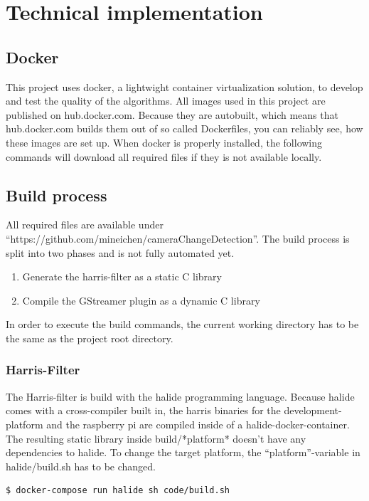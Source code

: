 \chapter {Technical implementation}

\section{ Docker }
This project uses docker, a lightwight container virtualization solution, to develop and test the quality of the algorithms. All images used in this project are published on hub.docker.com. Because they are autobuilt, which means that hub.docker.com builds them out of so called Dockerfiles, you can reliably see, how these images are set up. When docker is properly installed, the following commands will download all required files if they is not available locally.

\section{Build process}
All required files are available under \enquote{https://github.com/mineichen/cameraChangeDetection}. The build process is split into two phases and is not fully automated yet.
 
\begin{enumerate}
	\item{ Generate the harris-filter as a static C library}
	\item{ Compile the GStreamer plugin as a dynamic C library}
\end{enumerate}

In order to execute the build commands, the current working directory has to be the same as the project root directory.

\subsection{Harris-Filter}
The Harris-filter is build with the halide programming language. Because halide comes with a cross-compiler built in, the harris binaries for the development-platform and the raspberry pi are compiled inside of a halide-docker-container. The resulting static library inside build/*platform* doesn't have any dependencies to halide. To change the target platform, the \enquote{platform}-variable in halide/build.sh has to be changed.

\begin{lstlisting}[language=bash]
$ docker-compose run halide sh code/build.sh
\end{lstlisting}

